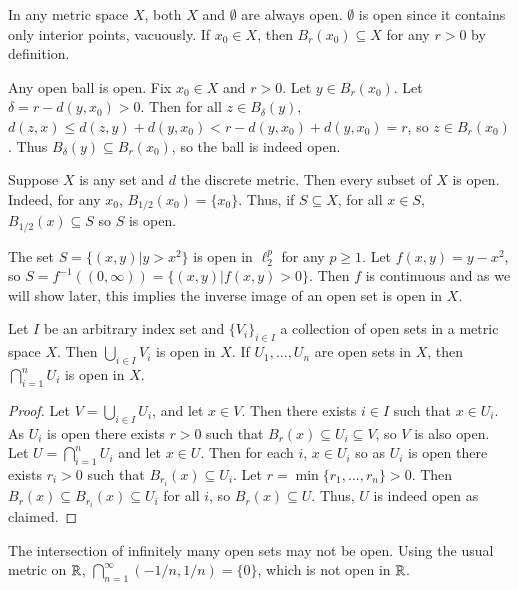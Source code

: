 \begin{eg}
    In any metric space $X$, both $X$ and $\emptyset$ are always open. $\emptyset$ is open since it contains only interior points, vacuously. If $x_0 \in X$, then $B_r(x_0) \subseteq X$ for any $r > 0$ by definition.
\end{eg}

\begin{eg}
    Any open ball is open. Fix $x_0 \in X$ and $r > 0$. Let $y \in B_r(x_0)$. Let $\delta = r - d(y,x_0) > 0$. Then for all $z \in B_{\delta}(y)$, $d(z,x) \leq d(z,y) + d(y,x_0) < r-d(y,x_0) + d(y,x_0) = r$, so $z \in B_r(x_0)$. Thus $B_{\delta}(y) \subseteq B_r(x_0)$, so the ball is indeed open.
\end{eg}

\begin{eg}
    Suppose $X$ is any set and $d$ the discrete metric. Then every subset of $X$ is open. Indeed, for any $x_0$, $B_{1/2}(x_0) = \{x_0\}$. Thus, if $S \subseteq X$, for all $x \in S$, $B_{1/2}(x) \subseteq S$ so $S$ is open.
\end{eg}

\begin{eg}
    The set $S = \{(x,y)\vert y > x^2\}$ is open in $\ell_2^p$ for any $p \geq 1$. Let $f(x,y) = y-x^2$, so $S = f^{-1}((0,\infty)) = \{(x,y)\vert f(x,y) > 0\}$. Then $f$ is continuous and as we will show later, this implies the inverse image of an open set is open in $X$.
\end{eg}

\begin{prop}
    Let $I$ be an arbitrary index set and $\{V_i\}_{i \in I}$ a collection of open sets in a metric space $X$. Then $\bigcup_{i \in I}V_i$ is open in $X$. If $U_1,...,U_n$ are open sets in $X$, then $\bigcap_{i=1}^nU_i$ is open in $X$.
\end{prop}
\begin{proof}
    Let $V = \bigcup_{i\in I}U_i$, and let $x \in V$. Then there exists $i \in I$ such that $x \in U_i$. As $U_i$ is open there exists $r > 0$ such that $B_r(x) \subseteq U_i \subseteq V$, so $V$ is also open. Let $U = \bigcap_{i=1}^nU_i$ and let $x \in U$. Then for each $i$, $x \in U_i$ so as $U_i$ is open there exists $r_i > 0$ such that $B_{r_i}(x) \subseteq U_i$. Let $r = \min\{r_1,...,r_n\} > 0$. Then $B_r(x) \subseteq B_{r_i}(x) \subseteq U_i$ for all $i$, so $B_r(x) \subseteq U$. Thus, $U$ is indeed open as claimed.
\end{proof}

\begin{eg}
    The intersection of infinitely many open sets may not be open. Using the usual metric on $\mathbb R$, $\bigcap_{n=1}^{\infty}(-1/n,1/n) = \{0\}$, which is not open in $\mathbb R$.
\end{eg}

